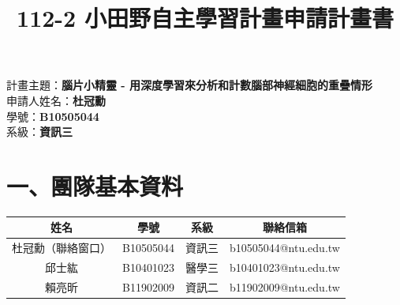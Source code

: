 \documentclass[12pt,a4paper]{article}
\begin{document}
\title{112-2 小田野自主學習計畫申請計畫書}
\date{}
\maketitle
\noindent 計畫主題：\textbf{腦片小精靈 - 用深度學習來分析和計數腦部神經細胞的重疊情形} \\
申請人姓名：\textbf{杜冠勳} \\
學號：\textbf{B10505044} \\
系級：\textbf{資訊三} \\

\section*{一、團隊基本資料}
\begin{center}
    \begin{tabular}{ | c | c | c | c | }
    \hline
    姓名 & 學號 & 系級 & 聯絡信箱 \\ \hline
    杜冠勳（聯絡窗口） & B10505044 & 資訊三 & b10505044@ntu.edu.tw \\ \hline
    邱士紘 & B10401023 & 醫學三 & b10401023@ntu.edu.tw  \\ \hline
    賴亮昕 & B11902009 & 資訊二 & b11902009@ntu.edu.tw \\ \hline
    
    \end{tabular}
\end{center}
\end{document}
